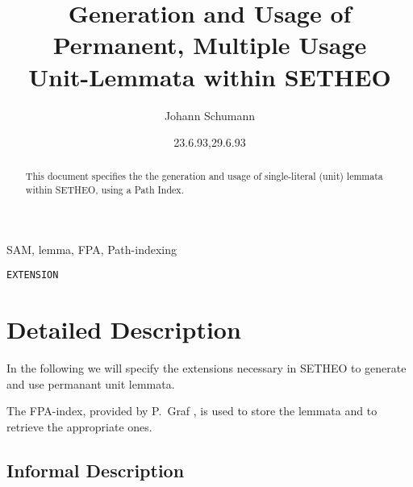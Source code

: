 
\def\SAM{{\sc S\kern-.13em\lower.45ex\hbox{A}\kern-.13emM}}

\title{Generation and Usage of Permanent,
        Multiple Usage \\
Unit-Lemmata within SETHEO}
\author{Johann Schumann}
\date{23.6.93,29.6.93}



\maketitle

\begin{abstract}
This document specifies the the generation and usage of single-literal
(unit) lemmata within SETHEO, using a Path Index.
\end{abstract}

  SAM, lemma, FPA, Path-indexing

 {\tt EXTENSION}

\section{Detailed Description}

In the following we will specify the extensions necessary in SETHEO
to generate and use permanant unit lemmata.


The FPA-index, provided by P.~Graf \cite{Graf92}, is used to store
the lemmata and to retrieve the appropriate ones.

\subsection{Informal Description}

